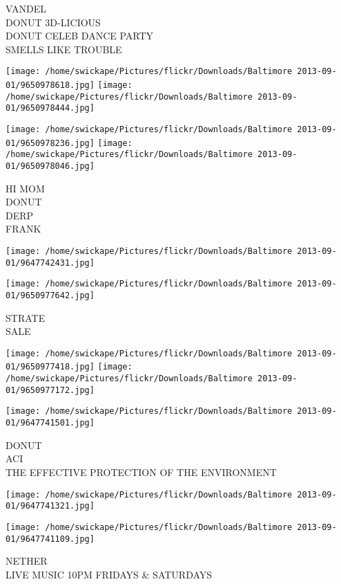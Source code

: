 \documentclass[10pt,letterpaper]{article}
\begin{document}
VANDEL\\
DONUT 3D{-}LICIOUS\\
DONUT CELEB DANCE PARTY\\
SMELLS LIKE TROUBLE
\pagebreak

\texttt{[image: /home/swickape/Pictures/flickr/Downloads/Baltimore 2013-09-01/9650978618.jpg]}
\texttt{[image: /home/swickape/Pictures/flickr/Downloads/Baltimore 2013-09-01/9650978444.jpg]}

\texttt{[image: /home/swickape/Pictures/flickr/Downloads/Baltimore 2013-09-01/9650978236.jpg]}
\texttt{[image: /home/swickape/Pictures/flickr/Downloads/Baltimore 2013-09-01/9650978046.jpg]}

HI MOM\\
DONUT\\
DERP\\
FRANK
\pagebreak

\texttt{[image: /home/swickape/Pictures/flickr/Downloads/Baltimore 2013-09-01/9647742431.jpg]}

\vspace{0.25in}
\texttt{[image: /home/swickape/Pictures/flickr/Downloads/Baltimore 2013-09-01/9650977642.jpg]}

STRATE\\
SALE
\pagebreak

\texttt{[image: /home/swickape/Pictures/flickr/Downloads/Baltimore 2013-09-01/9650977418.jpg]}
\texttt{[image: /home/swickape/Pictures/flickr/Downloads/Baltimore 2013-09-01/9650977172.jpg]}

\vspace{0.25in}
\texttt{[image: /home/swickape/Pictures/flickr/Downloads/Baltimore 2013-09-01/9647741501.jpg]}

DONUT\\
ACI\\
THE EFFECTIVE PROTECTION OF THE ENVIRONMENT
\pagebreak

\texttt{[image: /home/swickape/Pictures/flickr/Downloads/Baltimore 2013-09-01/9647741321.jpg]}

\vspace{0.25in}
\texttt{[image: /home/swickape/Pictures/flickr/Downloads/Baltimore 2013-09-01/9647741109.jpg]}

NETHER\\
LIVE MUSIC 10PM FRIDAYS \& SATURDAYS
\pagebreak
\end{document}
